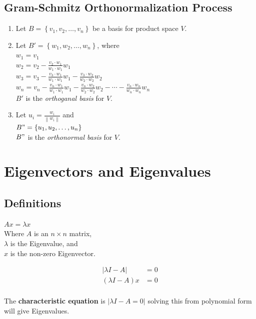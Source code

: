 \documentclass[]{article}
\begin{document}
\subsection{Gram-Schmitz Orthonormalization Process}
\begin{enumerate}
	\item Let $B = \left\lbrace  v_1,v_2, \ldots, v_n\right\rbrace $ 
		be a basis for product space $V$.
	\item Let $B' = \left\lbrace w_1,w_2, \ldots, w_n\right\rbrace $, where \\
		$w_1 = v_1$ \\
		$w_2 = v_2 - \frac{v_2 \cdot w_1}{w_1 \cdot w_1}w_1 $ \\
		$w_3 = v_3 - \frac{v_3 \cdot w_1}{w_1 \cdot w_1}w_1 
				   - \frac{v_3 \cdot w_2}{w_2 \cdot w_2}w_2 $ \\
		$w_n = v_n - \frac{v_n \cdot w_1}{w_1 \cdot w_1}w_1 
		           - \frac{v_n \cdot w_2}{w_2 \cdot w_2}w_2 - \cdots
		           - \frac{v_n \cdot w_n}{w_n \cdot w_n}w_n $ \\
		$B'$ is the \emph{orthoganal basis} for $V$.
	\item Let $u_i = \frac{w_i}{\left\| w_i\right\| } $ and \\
		$B" = \left\lbrace  u_1,u_2, \ldots, u_n\right\rbrace $ \\
		$B"$ is the \emph{orthonormal basis} for $V$.
\end{enumerate}

\section{Eigenvectors and Eigenvalues}
\subsection{Definitions}
$ Ax = \lambda x $ \\
Where $A$ is an $n \times n$ matrix, \\
$\lambda$ is the Eigenvalue, and \\
$x$ is the non-zero Eigenvector.

\begin{align*}
	\left| \lambda I - A \right| &= 0 \\
	( \lambda I - A )x &= 0 \\
\end{align*}

The \textbf{characteristic equation} is $\left| \lambda I - A = 0 \right| $ solving this from polynomial form will give Eigenvalues. 
\end{document}
